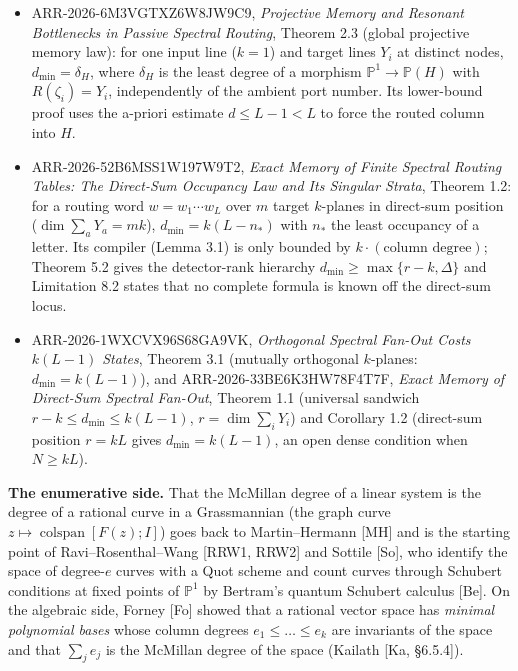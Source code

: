 \documentclass[
  11pt,
  a4paper,
]{article}
\providecommand{\tightlist}{%
  \setlength{\itemsep}{0pt}\setlength{\parskip}{0pt}}
\begin{document}
\begin{itemize}
\tightlist
\item
  ARR-2026-6M3VGTXZ6W8JW9C9, \emph{Projective Memory and Resonant
  Bottlenecks in Passive Spectral Routing}, Theorem 2.3 (global
  projective memory law): for one input line (\(k=1\)) and target lines
  \(Y_i\) at distinct nodes, \(d_{\min}=\delta_H\), where \(\delta_H\)
  is the least degree of a morphism \(\mathbb P^1\to\mathbb P(H)\) with
  \(R(\zeta_i)=Y_i\), independently of the ambient port number. Its
  lower-bound proof uses the a-priori estimate \(d\le L-1<L\) to force
  the routed column into \(H\).
\item
  ARR-2026-52B6MSS1W197W9T2, \emph{Exact Memory of Finite Spectral
  Routing Tables: The Direct-Sum Occupancy Law and Its Singular Strata},
  Theorem 1.2: for a routing word \(w=w_1\cdots w_L\) over \(m\) target
  \(k\)-planes in direct-sum position (\(\dim\sum_aY_a=mk\)),
  \(d_{\min}=k(L-n_*)\) with \(n_*\) the least occupancy of a letter.
  Its compiler (Lemma 3.1) is only bounded by
  \(k\cdot(\text{column degree})\); Theorem 5.2 gives the detector-rank
  hierarchy \(d_{\min}\ge\max\{r-k,\allowbreak{}\Delta\}\) and Limitation 8.2 states
  that no complete formula is known off the direct-sum locus.
\item
  ARR-2026-1WXCVX96S68GA9VK, \emph{Orthogonal Spectral Fan-Out Costs
  \(k(L-1)\) States}, Theorem 3.1 (mutually orthogonal \(k\)-planes:
  \(d_{\min}=k(L-1)\)), and ARR-2026-33BE6K3HW78F4T7F, \emph{Exact
  Memory of Direct-Sum Spectral Fan-Out}, Theorem 1.1 (universal
  sandwich \(r-k\le d_{\min}\le k(L-1)\), \(r=\dim\sum_iY_i\)) and
  Corollary 1.2 (direct-sum position \(r=kL\) gives \(d_{\min}=k(L-1)\),
  an open dense condition when \(N\ge kL\)).
\end{itemize}

\textbf{The enumerative side.} That the McMillan degree of a linear
system is the degree of a rational curve in a Grassmannian (the graph
curve \(z\mapsto\operatorname{colspan}[F(z);\allowbreak{}I]\)) goes back to
Martin--Hermann {[}MH{]} and is the starting point of
Ravi--Rosenthal--Wang {[}RRW1, RRW2{]} and Sottile {[}So{]}, who
identify the space of degree-\(e\) curves with a Quot scheme and count
curves through Schubert conditions at fixed points of \(\mathbb P^1\) by
Bertram's quantum Schubert calculus {[}Be{]}. On the algebraic side,
Forney {[}Fo{]} showed that a rational vector space has \emph{minimal
polynomial bases} whose column degrees \(e_1\le\dots\le e_k\) are
invariants of the space and that \(\sum_je_j\) is the McMillan degree of
the space (Kailath {[}Ka, §6.5.4{]}).
\end{document}
